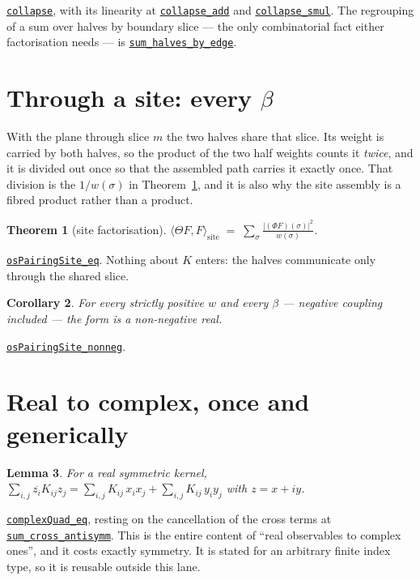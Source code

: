 \documentclass[11pt]{article}
\newtheorem{theorem}{Theorem}[section]
\newtheorem{lemma}[theorem]{Lemma}
\newtheorem{corollary}[theorem]{Corollary}
\theoremstyle{definition}
\newcommand{\anchor}{2d0346b2cc75d1cdf2e0ea0cefea4a8ef3be9c84}
\newcommand{\osline}[3]{%
  \href{https://github.com/lluiseriksson/THE-ERIKSSON-PROGRAMME/blob/\anchor/YangMills/OS/#1.lean\#L#2}{\nolinkurl{#3}}}
\begin{document}
\osline{SpatialOS}{100}{collapse}, with its linearity at
\osline{SpatialOS}{105}{collapse\_add} and
\osline{SpatialOS}{114}{collapse\_smul}.  The regrouping of a sum over halves by
boundary slice --- the only combinatorial fact either factorisation needs --- is
\osline{SpatialOS}{123}{sum\_halves\_by\_edge}.

\section{Through a site: every $\beta$}\label{sec:site}

With the plane through slice $m$ the two halves share that slice.  Its weight is
carried by both halves, so the product of the two half weights counts it
\emph{twice}, and it is divided out once so that the assembled path carries it
exactly once.  That division is the $1/w(\sigma)$ in Theorem~\ref{thm:site}, and
it is also why the site assembly is a fibred product rather than a product.

\begin{theorem}[site factorisation]\label{thm:site}
$\displaystyle \langle\Theta F,F\rangle_{\mathrm{site}}
   \;=\;\sum_\sigma \frac{|(\Phi F)(\sigma)|^{2}}{w(\sigma)}.$
\end{theorem}

\osline{SpatialOS}{162}{osPairingSite\_eq}.  Nothing about $K$ enters: the
halves communicate only through the shared slice.

\begin{corollary}\label{cor:site}
For every strictly positive $w$ and \emph{every} $\beta$ --- negative coupling
included --- the form is a non-negative real.
\end{corollary}

\osline{SpatialOS}{190}{osPairingSite\_nonneg}.

\section{Real to complex, once and generically}\label{sec:complex}

\begin{lemma}\label{lem:complex}
For a real \emph{symmetric} kernel,
$\sum_{i,j}\overline{z_i}K_{ij}z_j
  = \sum_{i,j}K_{ij}\,x_ix_j + \sum_{i,j}K_{ij}\,y_iy_j$
with $z=x+iy$.
\end{lemma}

\osline{SpatialOS}{220}{complexQuad\_eq}, resting on the cancellation of the
cross terms at
\osline{SpatialOS}{209}{sum\_cross\_antisymm}.  This is the entire content of
``real observables to complex ones'', and it costs exactly symmetry.  It is
stated for an arbitrary finite index type, so it is reusable outside this lane.
\end{document}
